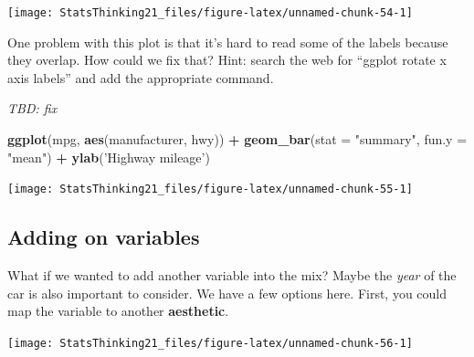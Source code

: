 \documentclass[12pt,]{book}
\newenvironment{Shaded}{\begin{snugshade}}{\end{snugshade}}
\newcommand{\CommentTok}[1]{\textcolor[rgb]{0.56,0.35,0.01}{\textit{#1}}}
\newcommand{\DataTypeTok}[1]{\textcolor[rgb]{0.13,0.29,0.53}{#1}}
\newcommand{\KeywordTok}[1]{\textcolor[rgb]{0.13,0.29,0.53}{\textbf{#1}}}
\newcommand{\NormalTok}[1]{#1}
\newcommand{\OperatorTok}[1]{\textcolor[rgb]{0.81,0.36,0.00}{\textbf{#1}}}
\newcommand{\StringTok}[1]{\textcolor[rgb]{0.31,0.60,0.02}{#1}}
\begin{document}
\texttt{[image: StatsThinking21\_files/figure-latex/unnamed-chunk-54-1]}

One problem with this plot is that it's hard to read some of the labels because they overlap. How could we fix that? Hint: search the web for ``ggplot rotate x axis labels'' and add the appropriate command.

\emph{TBD: fix}

\begin{Shaded}
\begin{Highlighting}[]
\KeywordTok{ggplot}\NormalTok{(mpg, }\KeywordTok{aes}\NormalTok{(manufacturer, hwy)) }\OperatorTok{+}
\StringTok{  }\KeywordTok{geom_bar}\NormalTok{(}\DataTypeTok{stat =} \StringTok{"summary"}\NormalTok{, }\DataTypeTok{fun.y =} \StringTok{"mean"}\NormalTok{)  }\OperatorTok{+}\StringTok{ }
\StringTok{  }\KeywordTok{ylab}\NormalTok{(}\StringTok{'Highway mileage'}\NormalTok{)}
\end{Highlighting}
\end{Shaded}

\texttt{[image: StatsThinking21\_files/figure-latex/unnamed-chunk-55-1]}

\hypertarget{adding-on-variables}{%
\subsection{Adding on variables}\label{adding-on-variables}}

What if we wanted to add another variable into the mix? Maybe the \emph{year} of the car is also important to consider. We have a few options here. First, you could map the variable to another \textbf{aesthetic}.

\begin{Shaded}
\end{Shaded}

\texttt{[image: StatsThinking21\_files/figure-latex/unnamed-chunk-56-1]}
\end{document}
